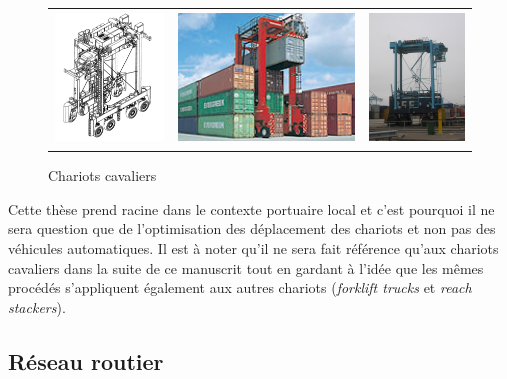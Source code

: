 \begin{figure}[ht]
 \label{fig:sc}
 \begin{center}
  \begin{tabular}{ccc}
	  \includegraphics[height=3.5cm]{chapitres/application/schema_sc.jpg} & \includegraphics[height=3.5cm]{chapitres/application/tn-straddle-carriers.jpg} & \includegraphics[height=3.5cm]{chapitres/application/containerlift_straddle_carrier.jpg}
  \end{tabular}
 \end{center}
  \caption{Chariots cavaliers}
\end{figure}

Cette thèse prend racine dans le contexte portuaire local et c'est pourquoi il ne sera question que de l'optimisation des déplacement des chariots et non pas des véhicules automatiques. Il est à noter qu'il ne sera fait référence qu'aux chariots cavaliers dans la suite de ce manuscrit tout en gardant à l'idée que les mêmes procédés s'appliquent également aux autres chariots (\textit{forklift trucks} et \textit{reach stackers}).

\subsection{Réseau routier}

